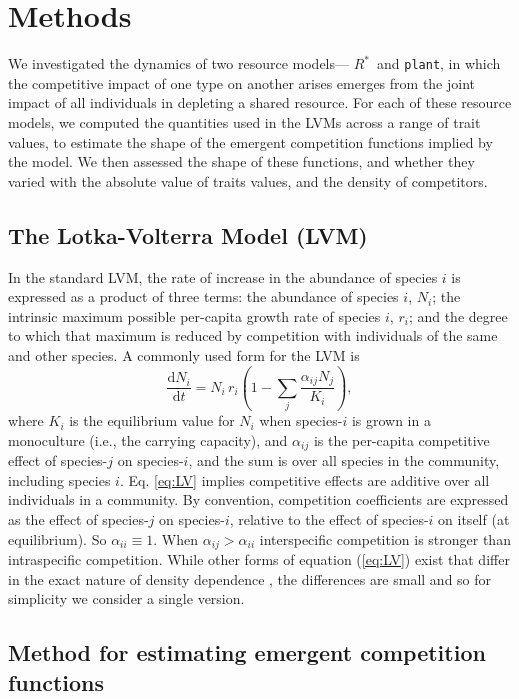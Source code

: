\documentclass[a4paper,11pt]{article}
\newcommand{\ud}{\ensuremath{\mathrm{d}}}
\newcommand{\Rstar}{\ensuremath{R^*}}
\newcommand{\plant}{{\tt plant}}
\begin{document}
\section{Methods}

We investigated the dynamics of two resource models--- \Rstar\  and \plant, in which the competitive impact of one type on another arises emerges from the joint impact of all individuals in depleting a shared resource. For each of these resource models, we computed the quantities used in the LVMs across a range of trait values, to estimate the shape of the emergent competition functions implied by the model. We then assessed the shape of these functions, and whether they varied with the absolute value of traits values, and the density of competitors.

\subsection{The Lotka-Volterra Model (LVM)}

In the standard LVM, the rate of increase in the abundance of species $i$ is expressed as a product of three terms: the abundance of species $i$, $N_i$; the intrinsic maximum possible per-capita growth rate of species $i$, $r_i$; and the degree to which that maximum is reduced by competition with individuals of the same and other species. A commonly used form for the LVM is 
\begin{equation} \label{eq:LV} 
	\frac{\ud N_i}{\ud t} = N_i\, r_i \left(1 - \sum_j \frac{\alpha_{ij} N_j}{K_i}\right), 
\end{equation}
where $K_i$ is the equilibrium value for $N_i$ when species-$i$ is grown in a monoculture (i.e., the carrying capacity), and $\alpha_{ij}$ is the per-capita competitive effect of species-$j$ on species-$i$, and the sum is over all species in the community, including species $i$. Eq. \ref{eq:LV} implies competitive effects are additive over all individuals in a community. By convention, competition coefficients are expressed as the effect of species-$j$ on species-$i$, relative to the effect of species-$i$ on itself (at equilibrium).  So $\alpha_{ii} \equiv 1$. When $\alpha_{ij} > \alpha_{ii}$ interspecific competition is stronger than intraspecific competition. While other forms of equation (\ref{eq:LV}) exist that differ in the exact nature of density dependence \citep[e.g.][]{Leimar-2013}, the differences are small and so for simplicity we consider a single version.


\subsection{Method for estimating emergent competition functions}
\end{document}
